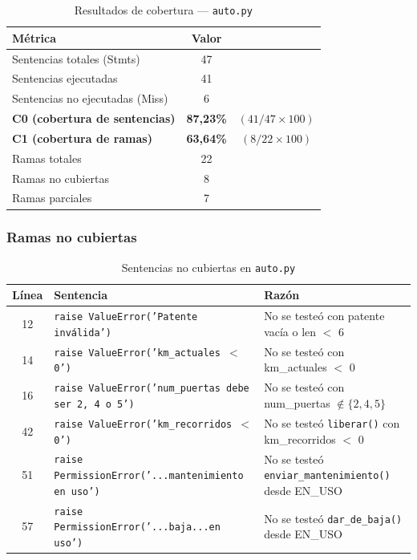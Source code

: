 \begin{table}[ht]
\centering
\caption{Resultados de cobertura --- \texttt{auto.py}}
\label{tab:cobertura-auto}
\begin{tabular}{lcc}
\toprule
Métrica & Valor & \\
\midrule
Sentencias totales (Stmts) & 47 & \\
Sentencias ejecutadas & 41 & \\
Sentencias no ejecutadas (Miss) & 6 & \\
\textbf{C0 (cobertura de sentencias)} & \textbf{87,23\%} & $(41/47 \times 100)$ \\
\textbf{C1 (cobertura de ramas)} & \textbf{63,64\%} & $(8/22 \times 100)$ \\
\midrule
Ramas totales & 22 & \\
Ramas no cubiertas & 8 & \\
Ramas parciales & 7 & \\
\bottomrule
\end{tabular}
\end{table}

\subsubsection*{Ramas no cubiertas}

\begin{table}[ht]
\centering
\caption{Sentencias no cubiertas en \texttt{auto.py}}
\label{tab:no-cubiertas-auto}
\begin{tabular}{cp{6cm}p{4cm}}
\toprule
Línea & Sentencia & Razón \\
\midrule
12 & \texttt{raise ValueError('Patente inválida')} & No se testeó con patente vacía o len $<$ 6 \\
14 & \texttt{raise ValueError('km\_actuales $<$ 0')} & No se testeó con km\_actuales $<$ 0 \\
16 & \texttt{raise ValueError('num\_puertas debe ser 2, 4 o 5')} & No se testeó con num\_puertas $\notin \{2,4,5\}$ \\
42 & \texttt{raise ValueError('km\_recorridos $<$ 0')} & No se testeó \texttt{liberar()} con km\_recorridos $<$ 0 \\
51 & \texttt{raise PermissionError('...mantenimiento en uso')} & No se testeó \texttt{enviar\_mantenimiento()} desde EN\_USO \\
57 & \texttt{raise PermissionError('...baja...en uso')} & No se testeó \texttt{dar\_de\_baja()} desde EN\_USO \\
\bottomrule
\end{tabular}
\end{table}

